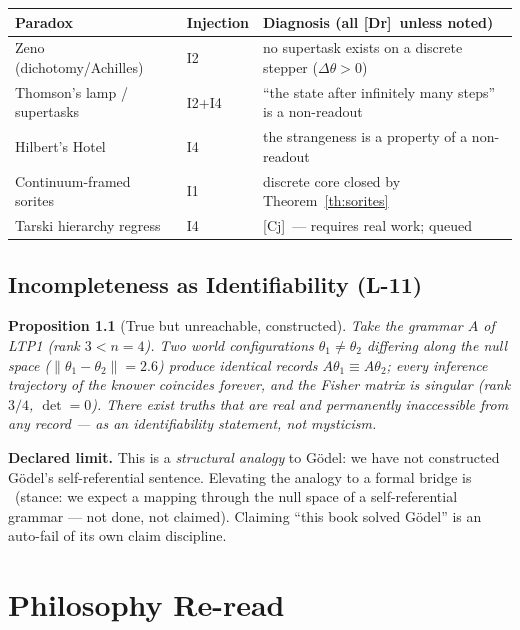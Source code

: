 \documentclass[11pt,a4paper,twoside]{book}
\newcommand{\tier}[1]{\textnormal{\small\textsf{[#1]}}}
\newcommand{\Dr}{\tier{Dr}}\newcommand{\Cj}{\tier{Cj}}\newcommand{\Wf}{\tier{Wf}}
\theoremstyle{plain}
\newtheorem{proposition}[theorem]{Proposition}
\theoremstyle{definition}
\theoremstyle{remark}
\begin{document}
\begin{center}
\begin{tabular}{@{}lll@{}}
\toprule
Paradox & Injection & Diagnosis (all \Dr\ unless noted)\\
\midrule
Zeno (dichotomy/Achilles) & I2 & no supertask exists on a discrete stepper ($\Delta\theta>0$)\\
Thomson's lamp / supertasks & I2+I4 & ``the state after infinitely many steps'' is a non-readout\\
Hilbert's Hotel & I4 & the strangeness is a property of a non-readout\\
Continuum-framed sorites & I1 & discrete core closed by Theorem~\ref{th:sorites}\\
Tarski hierarchy regress & I4 & \Cj\ --- requires real work; queued\\
\bottomrule
\end{tabular}
\end{center}

\chapter{Incompleteness as Identifiability (L-11)}

\begin{proposition}[True but unreachable, constructed]\fd\label{prop:null}
Take the grammar $A$ of LTP1 (rank $3<n=4$). Two world configurations
$\theta_1\neq\theta_2$ differing along the null space
($\|\theta_1-\theta_2\|=2.6$) produce \emph{identical} records
$A\theta_1\equiv A\theta_2$; every inference trajectory of the knower
coincides forever, and the Fisher matrix is singular (rank $3/4$,
$\det=0$). There exist truths that are real and permanently inaccessible
from any record --- as an \emph{identifiability statement}, not mysticism.
\end{proposition}

\textbf{Declared limit.} This is a \emph{structural analogy} to G\"odel: we
have not constructed G\"odel's self-referential sentence. Elevating the
analogy to a formal bridge is \OpenT\ (stance: we expect a mapping through
the null space of a self-referential grammar --- not done, not claimed).
Claiming ``this book solved G\"odel'' is an auto-fail of its own claim
discipline.

\part{Philosophy Re-read}
\end{document}
